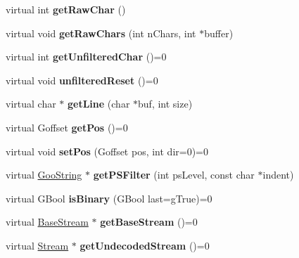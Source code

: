 \begin{DoxyCompactItemize}
virtual int {\bfseries get\+Raw\+Char} ()
\item 
\mbox{\label{class_stream_a1362b13c09539aafc21077a26f20b341}} 
virtual void {\bfseries get\+Raw\+Chars} (int n\+Chars, int $\ast$buffer)
\item 
\mbox{\label{class_stream_ae9d841faa73a7030f72cbe4f894e9d39}} 
virtual int {\bfseries get\+Unfiltered\+Char} ()=0
\item 
\mbox{\label{class_stream_a6c2939945dd2a9b633d3105bc24aa544}} 
virtual void {\bfseries unfiltered\+Reset} ()=0
\item 
\mbox{\label{class_stream_ac8cb7b669cda35db3b351630beb3bcda}} 
virtual char $\ast$ {\bfseries get\+Line} (char $\ast$buf, int size)
\item 
\mbox{\label{class_stream_a4bc7ca8d98ab1734a3f7bd3cc586a4f5}} 
virtual Goffset {\bfseries get\+Pos} ()=0
\item 
\mbox{\label{class_stream_ae1cda8489c45df123e90e826f5543ac7}} 
virtual void {\bfseries set\+Pos} (Goffset pos, int dir=0)=0
\item 
\mbox{\label{class_stream_a260a07ca4a0a1f4853881a1a5bb27576}} 
virtual \hyperlink{class_goo_string}{Goo\+String} $\ast$ {\bfseries get\+P\+S\+Filter} (int ps\+Level, const char $\ast$indent)
\item 
\mbox{\label{class_stream_abd17c5f2b0f33b5c50272a00b380ffaf}} 
virtual G\+Bool {\bfseries is\+Binary} (G\+Bool last=g\+True)=0
\item 
\mbox{\label{class_stream_a5efa11392387347dbbe508cbd726ca44}} 
virtual \hyperlink{class_base_stream}{Base\+Stream} $\ast$ {\bfseries get\+Base\+Stream} ()=0
\item 
\mbox{\label{class_stream_a59d596c6e5f1732f49afef156e783e4a}} 
virtual \hyperlink{class_stream}{Stream} $\ast$ {\bfseries get\+Undecoded\+Stream} ()=0
\item 
\mbox{\label{class_stream_a32e1cfe6129529d5de400b4b64e0d74d}} 

\end{DoxyCompactItemize}
